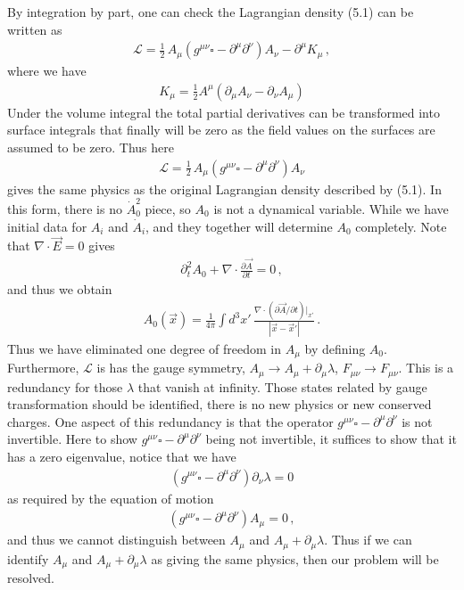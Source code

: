 \documentclass[11pt, onesided]{book}
\theoremstyle{break}
\theoremstyle{break}
\newcommand{\pd}{\partial}
\begin{document}
By integration by part, one can check the Lagrangian density (5.1) can be written as
\begin{align*}
\mathcal{L} = \frac{1}{2}\, A_\mu\left( g^{\mu\nu}\square - \pd^\mu \pd^\nu \right) A_\nu - \pd^\mu K_\mu\,,
\end{align*}
where we have
\begin{align*}
K_\mu = \frac{1}{2}A^\mu \left( \pd_\mu A_\nu - \pd_\nu A_\mu\right)
\end{align*}
Under the volume integral the total partial derivatives can be transformed into surface integrals that finally will be zero as the field values on the surfaces are assumed to be zero. Thus here
\begin{align*}
\mathcal{L} = \frac{1}{2}\, A_\mu\left( g^{\mu\nu}\square - \pd^\mu \pd^\nu \right)A_\nu
\end{align*}
gives the same physics as the original Lagrangian density described by (5.1). In this form, there is no  $\dot{A}_0^2$ piece, so $A_0$ is not a dynamical variable. While we have initial data for $A_i$ and $\dot{A}_i$, and they together will determine $A_0$ completely. Note that $\nabla \cdot \vec{E} = 0$ gives
\begin{align*}
\pd_t^2 A_0 + \nabla \cdot \frac{\pd \vec{A}}{\pd t} = 0\,,
\end{align*}
and thus we obtain
\begin{align}
A_0(\vec{x}) = \frac{1}{4\pi}\int d^3x'\, \frac{\nabla\cdot (\pd \vec{A}/\pd t)|_{x'}}{|\vec{x} - \vec{x}'|}\,.
\end{align}
Thus we have eliminated one degree of freedom in $A_\mu$ by defining $A_0$. Furthermore, $\mathcal{L}$ is has the gauge symmetry, $A_\mu \to A_\mu + \pd_\mu \lambda$, $F_{\mu\nu}\to F_{\mu\nu}$. This is a redundancy for those $\lambda$ that vanish at infinity. Those states related by gauge transformation should be identified, there is no new physics or new conserved charges.  One aspect of this redundancy is that the operator $g^{\mu\nu}\square - \pd^\mu \pd^\nu$ is not invertible. Here to show $g^{\mu\nu}\square - \pd^\mu \pd^\nu$ being not invertible, it suffices to show that it has a zero eigenvalue, notice that we have
\begin{align*}
(g^{\mu\nu}\square - \pd^\mu \pd^\nu) \pd_\nu \lambda = 0
\end{align*}
as required by the equation of motion
\begin{align*}
(g^{\mu\nu}\square - \pd^\mu \pd^\nu) A_\mu = 0\,,
\end{align*}
and thus we cannot distinguish between $A_\mu$ and $A_\mu + \pd_\mu \lambda$. Thus if we can identify $A_\mu$ and $A_\mu + \pd_\mu \lambda$ as giving the same physics, then our problem will be resolved. \\
\end{document}
